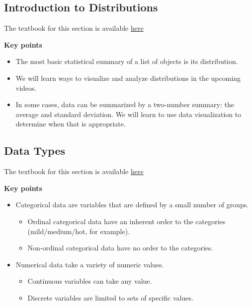\documentclass[
]{article}
\providecommand{\tightlist}{%
  \setlength{\itemsep}{0pt}\setlength{\parskip}{0pt}}
\begin{document}
\hypertarget{introduction-to-distributions}{%
\subsection{Introduction to
Distributions}\label{introduction-to-distributions}}

The textbook for this section is available
\href{https://rafalab.github.io/dsbook/distributions.html}{here}

\textbf{Key points}

\begin{itemize}
\tightlist
\item
  The most basic statistical summary of a list of objects is its
  distribution.
\item
  We will learn ways to visualize and analyze distributions in the
  upcoming videos.
\item
  In some cases, data can be summarized by a two-number summary: the
  average and standard deviation. We will learn to use data
  visualization to determine when that is appropriate.
\end{itemize}

\hypertarget{data-types}{%
\subsection{Data Types}\label{data-types}}

The textbook for this section is available
\href{https://rafalab.github.io/dsbook/distributions.html\#variable-types}{here}

\textbf{Key points}

\begin{itemize}
\tightlist
\item
  Categorical data are variables that are defined by a small number of
  groups.

  \begin{itemize}
  \tightlist
  \item
    Ordinal categorical data have an inherent order to the categories
    (mild/medium/hot, for example).
  \item
    Non-ordinal categorical data have no order to the categories.
  \end{itemize}
\item
  Numerical data take a variety of numeric values.

  \begin{itemize}
  \tightlist
  \item
    Continuous variables can take any value.
  \item
    Discrete variables are limited to sets of specific values.
  \end{itemize}
\end{itemize}
\end{document}
